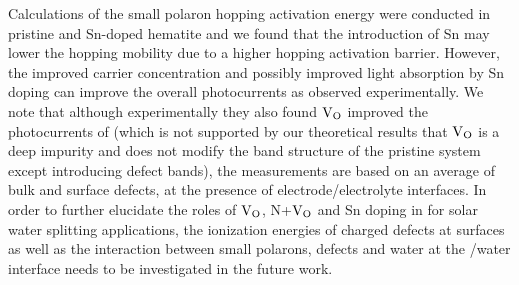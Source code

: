 Calculations of the small polaron hopping activation energy were conducted in pristine and Sn-doped hematite and we found that the introduction of Sn may lower the hopping mobility due to a higher hopping activation barrier. However, the improved carrier concentration and possibly improved light absorption  by Sn doping can improve the overall photocurrents as observed experimentally. We note that although experimentally they also found $\text{V}_\text{O}$  improved the photocurrents of  \cite{forster2015oxygen,ling2011sn} (which is not supported by our theoretical results that $\text{V}_\text{O}$ is a deep impurity and does not modify the band structure of the pristine system except introducing defect bands), the measurements are based on an average of bulk and surface defects, at the presence of electrode/electrolyte interfaces. In order to further elucidate the roles of $\text{V}_\text{O}$, N+$\text{V}_\text{O}$ and Sn doping in  for solar water splitting applications, the ionization energies of charged defects at surfaces as well as the interaction between small polarons, defects and water at the /water interface needs to be investigated in the future work.

